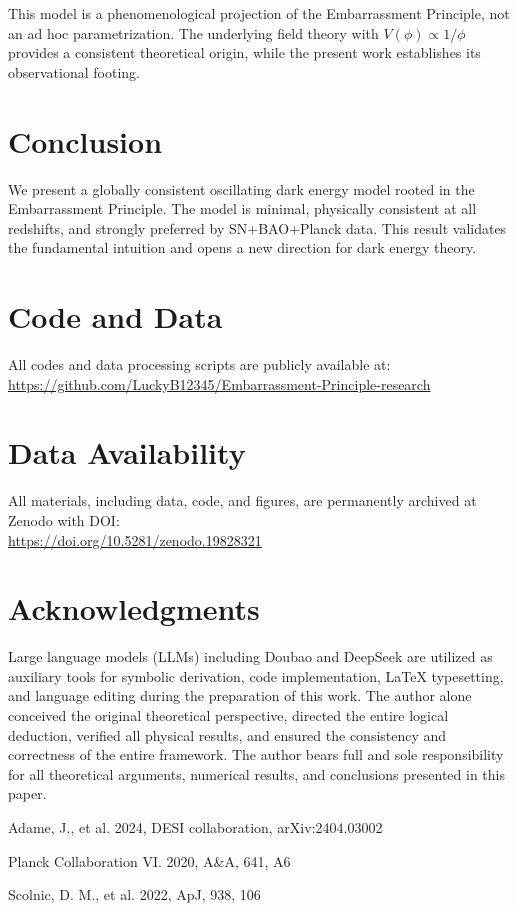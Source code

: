 \documentclass[10pt,twocolumn]{article}
\begin{document}
This model is a phenomenological projection of the Embarrassment Principle,
not an ad hoc parametrization.
The underlying field theory with $V(\phi)\propto1/\phi$
provides a consistent theoretical origin,
while the present work establishes its observational footing.

\section{Conclusion}
We present a globally consistent oscillating dark energy model
rooted in the Embarrassment Principle.
The model is minimal, physically consistent at all redshifts,
and strongly preferred by SN+BAO+Planck data.
This result validates the fundamental intuition
and opens a new direction for dark energy theory.

\section{Code and Data}
All codes and data processing scripts are publicly available at:\\
\url{https://github.com/LuckyB12345/Embarrassment-Principle-research}

\section{Data Availability}
All materials, including data, code, and figures, are permanently archived
at Zenodo with DOI:\\
\url{https://doi.org/10.5281/zenodo.19828321}

\section*{Acknowledgments}
Large language models (LLMs) including Doubao and DeepSeek are utilized as auxiliary tools for symbolic derivation, code implementation, LaTeX typesetting, and language editing during the preparation of this work. The author alone conceived the original theoretical perspective, directed the entire logical deduction, verified all physical results, and ensured the consistency and correctness of the entire framework. The author bears full and sole responsibility for all theoretical arguments, numerical results, and conclusions presented in this paper.

\begin{thebibliography}{}
Adame, J., et al. 2024, DESI collaboration, arXiv:2404.03002

Planck Collaboration VI. 2020, A\&A, 641, A6

Scolnic, D. M., et al. 2022, ApJ, 938, 106
\end{thebibliography}
\end{document}
